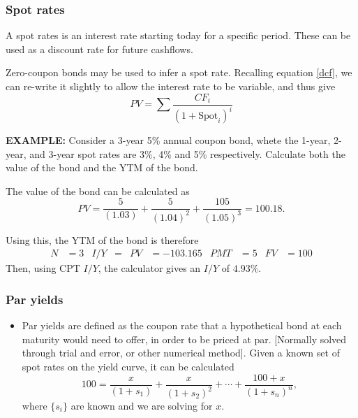 \documentclass[../notes_compiled.tex]{subfiles}
\begin{document}
\subsubsection{Spot rates}
\begin{itemize}
\item A spot rates is an interest rate starting today for a specific period. These can be used as a discount rate for future cashflows.
\item Zero-coupon bonds may be used to infer a spot rate. Recalling equation \ref{dcf}, we can re-write it slightly to allow the interest rate to be variable, and thus give
\begin{equation}
PV = \sum\frac{CF_{i}}{(1+\text{Spot}_{i})^{i}}
\end{equation}

{\color{RedViolet}
\item[] \textbf{EXAMPLE:} Consider a 3-year 5\% annual coupon bond, whete the 1-year, 2-year, and 3-year spot rates are 3\%, 4\% and 5\% respectively. Calculate both the value of the bond and the YTM of the bond.
}
{\color{RoyalBlue}
The value of the bond can be calculated as
\begin{equation*}
PV = \frac{5}{(1.03)} + \frac{5}{(1.04)^{2}} + \frac{105}{(1.05)^{3}} = 100.18.
\end{equation*}


\item[] Using this, the YTM of the bond is therefore
\begin{align*}
N&=3  & I / Y &=  & PV &=-103.165 & PMT &=5 & FV &= 100
\end{align*}
Then, using CPT $I / Y$, the calculator gives an $I / Y$ of $4.93\%$.

}
\end{itemize}

\subsubsection{Par yields}
\begin{itemize}
\item Par yields are defined as the coupon rate that a hypothetical bond at each maturity would need to offer, in order to be priced at par. [Normally solved through trial and error, or other numerical method]. Given a known set of spot rates on the yield curve, it can be calculated
\begin{equation}
100 = \frac{x}{(1+s_{1})} + \frac{x}{(1+s_{2})^{2}} + \cdots + \frac{100 + x}{(1+s_{n})^{n}},
\end{equation}
where $\{s_{i}\}$ are known and we are solving for $x$.
\end{itemize}
\end{document}
